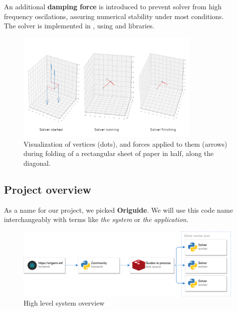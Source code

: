An additional \textbf{damping force} is introduced to prevent solver from
high frequency oscilations, assuring numerical stability under most conditions.\\

The solver is implemented in , using  and  libraries. 


\begin{figure}[H]
	\caption{Visualization of vertices (dots), and forces applied to them (arrows)
	during folding of a rectangular sheet of paper in half, along the diagonal. }
  \centering
    \includegraphics[width=0.8\textwidth]{assets/prototype-backend.png}
\end{figure}


\subsection{Project overview}
\label{section:project-overview}

As a name for our project, we picked \textbf{Origuide}.
We will use this code name interchangeably with terms like \textit{the system} or \textit{the application}.
\smallskip

\begin{figure}[H]
	\caption{High level system overview}
  \centering
    \includegraphics[width=\textwidth]{assets/architecture.png}
\end{figure}

